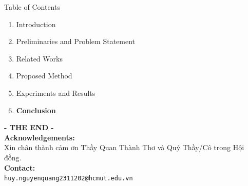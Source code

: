 \documentclass[aspectratio=169,9pt]{beamer}
\begin{document}
\begin{frame}{Table of Contents}
  \vspace{0.4cm}
  \begin{enumerate}[\bfseries 1]
    \setlength{\itemsep}{0.35cm}
    \item \color{gray} Introduction
    \item \color{gray} Preliminaries and Problem Statement
    \item \color{gray} Related Works
    \item \color{gray} Proposed Method
    \item \color{gray} Experiments and Results
    \item \textbf{\color{bkblue} Conclusion}
  \end{enumerate}
\end{frame}

{
\begin{frame}[plain]
  \vspace{1.0cm}
  \begin{center}
    {\Huge\textbf{\color{bkblue}- THE END -}}\\[0.8cm]

    \textbf{\color{black}Acknowledgements:}\\
    \small Xin chân thành cảm ơn Thầy Quan Thành Thơ và Quý Thầy/Cô trong Hội đồng.\\[1.2cm]

    \textbf{\color{black}Contact:}\\
    \texttt{\color{bkblue}huy.nguyenquang2311202@hcmut.edu.vn}
  \end{center}
\end{frame}
}
\end{document}
